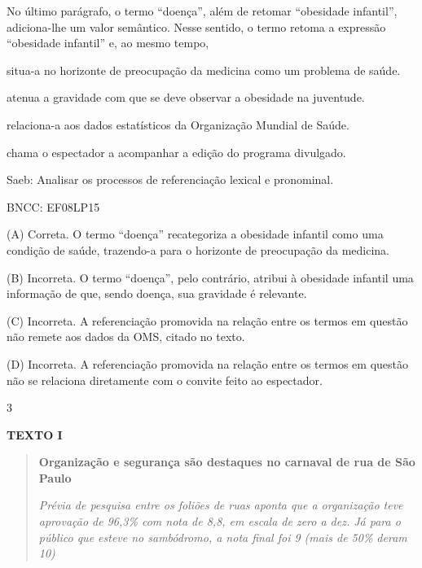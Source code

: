 
No último parágrafo, o termo ``doença'', além de retomar ``obesidade
infantil'', adiciona-lhe um valor semântico. Nesse sentido, o termo
retoma a expressão ``obesidade infantil'' e, ao mesmo tempo,

\begin{escolha}
\item situa-a no horizonte de preocupação da medicina como um problema de
saúde.

\item atenua a gravidade com que se deve observar a obesidade na juventude.

\item relaciona-a aos dados estatísticos da Organização Mundial de Saúde.

\item chama o espectador a acompanhar a edição do programa divulgado.
\end{escolha}

Saeb: Analisar os processos de referenciação lexical e pronominal.

BNCC: EF08LP15

(A) Correta. O termo ``doença'' recategoriza a obesidade infantil como
uma condição de saúde, trazendo-a para o horizonte de preocupação da
medicina.

(B) Incorreta. O termo ``doença'', pelo contrário, atribui à obesidade
infantil uma informação de que, sendo doença, sua gravidade é relevante.

(C) Incorreta. A referenciação promovida na relação entre os termos em
questão não remete aos dados da OMS, citado no texto.

(D) Incorreta. A referenciação promovida na relação entre os termos em
questão não se relaciona diretamente com o convite feito ao espectador.

\num{3}

\textbf{TEXTO I}

\begin{quote}
\textbf{Organização e segurança são destaques no carnaval de rua de São
Paulo}

\emph{Prévia de pesquisa entre os foliões de ruas aponta que a
organização teve aprovação de 96,3\% com nota de 8,8, em escala de zero
a dez. Já para o público que esteve no sambódromo, a nota final foi 9
(mais de 50\% deram 10)}
\end{quote}


